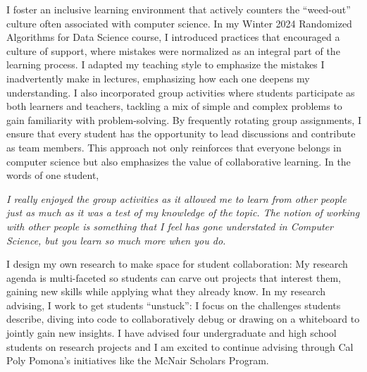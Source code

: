 \documentclass[11pt]{article}
\begin{document}
{I foster an inclusive learning environment that actively counters the “weed-out” culture often associated with computer science. In my Winter 2024 Randomized Algorithms for Data Science course, I introduced practices that encouraged a culture of support, where mistakes were normalized as an integral part of the learning process. I adapted my teaching style to emphasize the mistakes I inadvertently make in lectures, emphasizing how each one deepens my understanding. I also incorporated group activities where students participate as both learners and teachers, tackling a mix of simple and complex problems to gain familiarity with problem-solving. By frequently rotating group assignments, I ensure that every student has the opportunity to lead discussions and contribute as team members. This approach not only reinforces that everyone belongs in computer science but also emphasizes the value of collaborative learning. In the words of one student,

\begin{displayquote}
	\textit{I really enjoyed the group activities as it allowed me to learn from other people just as much as it was a test of my knowledge of the topic. The notion of working with other people is something that I feel has gone understated in Computer Science, but you learn so much more when you do.}
\end{displayquote}

I design my own research to make space for student collaboration: My research agenda is multi-faceted so students can carve out projects that interest them, gaining new skills while applying what they already know. In my research advising, I work to get students “unstuck”: I focus on the challenges students describe, diving into code to collaboratively debug or drawing on a whiteboard to jointly gain new insights. I have advised four undergraduate and high school students on research projects and I am excited to continue advising through Cal Poly Pomona’s initiatives like the McNair Scholars Program.


}
\end{document}
